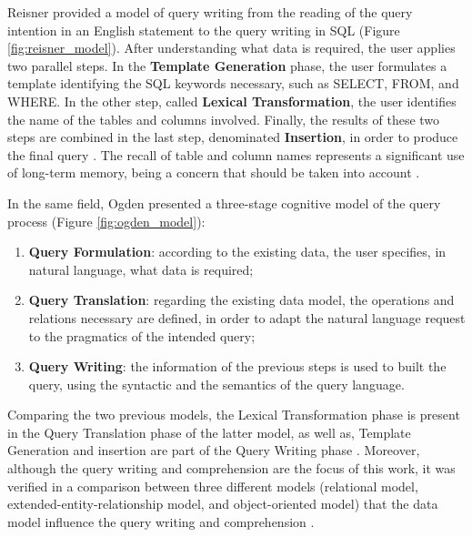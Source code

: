 Reisner \cite{humanFactorStudiesOfDatabaseQueryLanguages} provided a model of query writing from the reading of the query intention in an English statement to the query writing in SQL (Figure \ref{fig:reisner_model}). After understanding what data is required, the user applies two parallel steps. In the \textbf{Template Generation} phase, the user formulates a template identifying the SQL keywords necessary, such as SELECT, FROM, and WHERE. In the other step, called \textbf{Lexical Transformation}, the user identifies the name of the tables and columns involved. Finally, the results of these two steps are combined in the last step, denominated \textbf{Insertion}, in order to produce the final query \cite{humanFactorStudiesOfDatabaseQueryLanguages}. The recall of table and column names represents a significant use of long-term memory, being a concern that should be taken into account \cite{userErrorsInDatabaseQueryComposition}.

In the same field, Ogden \cite{implicationsOfACognitiveModelOfDatabaseQuery} presented a three-stage cognitive model of the query process (Figure \ref{fig:ogden_model}):

\begin{enumerate}
  \item \textbf{Query Formulation}: according to the existing data, the user specifies, in natural language, what data is required;
  \item \textbf{Query Translation}: regarding the existing data model, the operations and relations necessary are defined, in order to adapt the natural language request to the pragmatics of the intended query;
  \item \textbf{Query Writing}: the information of the previous steps is used to built the query, using the syntactic and the semantics of the query language.
\end{enumerate}

Comparing the two previous models, the Lexical Transformation phase is present in the Query Translation phase of the latter model, as well as, Template Generation and insertion are part of the Query Writing phase \cite{anEvaluationOfNoviceEndUserComputingPerformance}. Moreover, although the query writing and comprehension are the focus of this work, it was verified in a comparison between three different models (relational model, extended-entity-relationship model, and object-oriented model) that the data model influence the query writing and comprehension \cite{anEvaluationOfNoviceEndUserComputingPerformance}.

